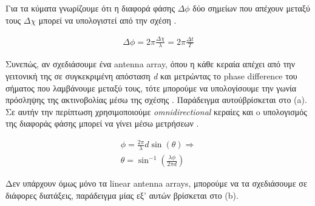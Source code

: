 Για τα κύματα γνωρίζουμε ότι η διαφορά φάσης $\Delta \phi$ δύο σημείων που απέχουν  
μεταξύ τους $\Delta \chi$ μπορεί να υπολογιστεί από την σχέση  \cite{phase-difference}.

\begin{align}
	\Delta \phi = 2\pi\frac{\Delta \chi}{\lambda} = 2\pi\frac{\Delta t}{T} \label{eq:phase-different-general}
\end{align}

Συνεπώς, αν σχεδιάσουμε ένα antenna array, όπου η κάθε κεραία απέχει από την γειτονική της σε συγκεκριμένη απόσταση \emph{d} και μετρώντας 
το phase difference του σήματος που λαμβάνουμε μεταξύ τους, τότε μπορούμε να υπολογίσουμε την γωνία πρόσληψης της ακτινοβολίας μέσω της 
σχέσης  \cite{wsn-Localization-techniques} \cite{youtube-phase-difference-equation}. Παράδειγμα αυτού\udot βρίσκεται στο  (a).
Σε αυτήν την περίπτωση χρησιμοποιούμε \emph{omnidirectional} κεραίες και o υπολογισμός της διαφοράς φάσης μπορεί να γίνει
μέσω μετρήσεων .

\begin{gather} 
	\phi = \frac{2\pi}{\lambda}d\sin(\theta) \Rightarrow \nonumber \\[2pt]
	\theta = \sin^{-1}\left(\frac{\lambda \phi}{2\pi d}\right) \label{eq:aoa-equation}
\end{gather}

Δεν υπάρχουν όμως μόνο τα linear antenna arrays, μπορούμε να τα σχεδιάσουμε σε διάφορες διατάξεις, 
παράδειγμα μίας εξ' αυτών βρίσκεται στο  (b).

